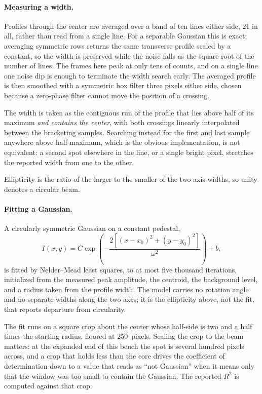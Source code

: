 \documentclass{article}
\begin{document}
\paragraph{Measuring a width.}
Profiles through the center are averaged over a band of ten lines either side, 21 in all, rather than read
from a single line. For a separable Gaussian this is exact: averaging symmetric rows returns the
same transverse profile scaled by a constant, so the width is preserved while the noise falls as
the square root of the number of lines. The frames here peak at only tens of counts, and on a
single line one noise dip is enough to terminate the width search early. The averaged profile is
then smoothed with a symmetric box filter three pixels either side, chosen because a zero-phase
filter cannot move the position of a crossing.

The width is taken as the contiguous run of the profile that lies above half of its maximum
\emph{and contains the center}, with both crossings linearly interpolated between the bracketing
samples. Searching instead for the first and last sample anywhere above half maximum, which is
the obvious implementation, is not equivalent: a second spot elsewhere in the line, or a single
bright pixel, stretches the reported width from one to the other.

Ellipticity is the ratio of the larger to the smaller of the two axis widths, so unity denotes a
circular beam.

\paragraph{Fitting a Gaussian.}
A circularly symmetric Gaussian on a constant pedestal,
\begin{equation}
    I(x,y) = C \exp\!\left(-\frac{2\left[(x-x_0)^2 + (y-y_0)^2\right]}{\omega^2}\right) + b ,
\end{equation}
is fitted by Nelder--Mead least squares, to at most five thousand iterations, initialized from
the measured peak amplitude, the centroid, the background level, and a radius taken from the
profile width. The model carries no rotation angle and no separate widths along the two axes; it
is the ellipticity above, not the fit, that reports departure from circularity.

The fit runs on a square crop about the center whose half-side is two and a half times the
starting radius, floored at 250~pixels. Scaling the crop to the beam matters: at the expanded end
of this bench the spot is several hundred pixels across, and a crop that holds less than the core
drives the coefficient of determination down to a value that reads as ``not Gaussian'' when it
means only that the window was too small to contain the Gaussian. The reported $R^2$ is computed
against that crop.
\end{document}
